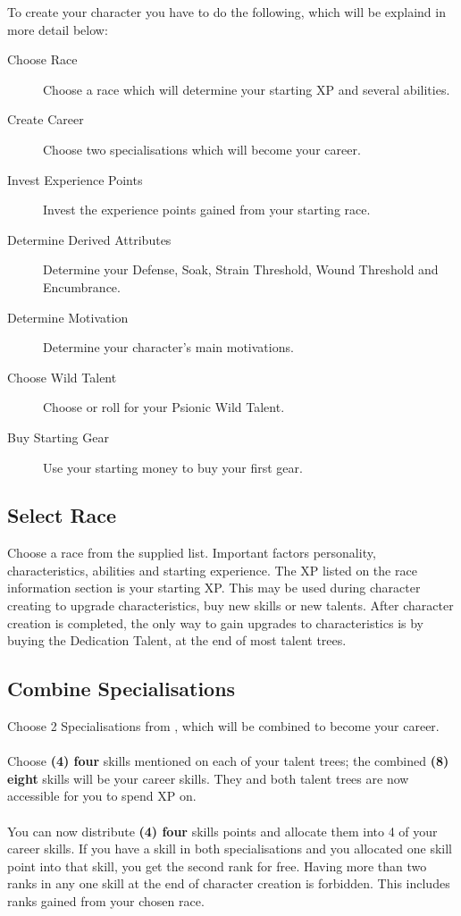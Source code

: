 \begin{multicols}{2}

To create your character you have to do the following, which will be explaind in more detail below:

\begin{description}
    \item [Choose Race] Choose a race which will determine your starting XP and several abilities.
    \item [Create Career] Choose two specialisations which will become your career.
    \item [Invest Experience Points] Invest the experience points gained from your starting race.
    \item [Determine Derived Attributes] Determine your Defense, Soak, Strain Threshold, Wound Threshold and Encumbrance.
    \item [Determine Motivation] Determine your character's main motivations.
    \item [Choose Wild Talent] Choose or roll for your Psionic Wild Talent.
    \item [Buy Starting Gear] Use your starting money to buy your first gear.
\end{description}

\subsection{Select Race}
Choose a race from the supplied list. Important factors personality, characteristics, abilities and starting experience.
The XP listed on the race information section is your starting XP. This may be used during character creating to upgrade characteristics, buy new skills or new talents.
After character creation is completed, the only way to gain upgrades to characteristics is by buying the Dedication Talent, at the end of most talent trees.

\subsection{Combine Specialisations}
Choose 2 Specialisations from , which will be combined to become your career.\\
\\
Choose \textbf{(4) four} skills mentioned on each of your talent trees; the combined \textbf{(8) eight} skills will be
your career skills. They and both talent trees are now accessible for you to spend XP on.\\
\\
You can now distribute \textbf{(4) four} skills points and allocate them into 4 of your career skills. If
you have a skill in both specialisations and you allocated one skill point into that skill,
you get the second rank for free. Having more than two ranks in any one skill at the end of
character creation is forbidden. This includes ranks gained from your chosen race.


\end{multicols}
